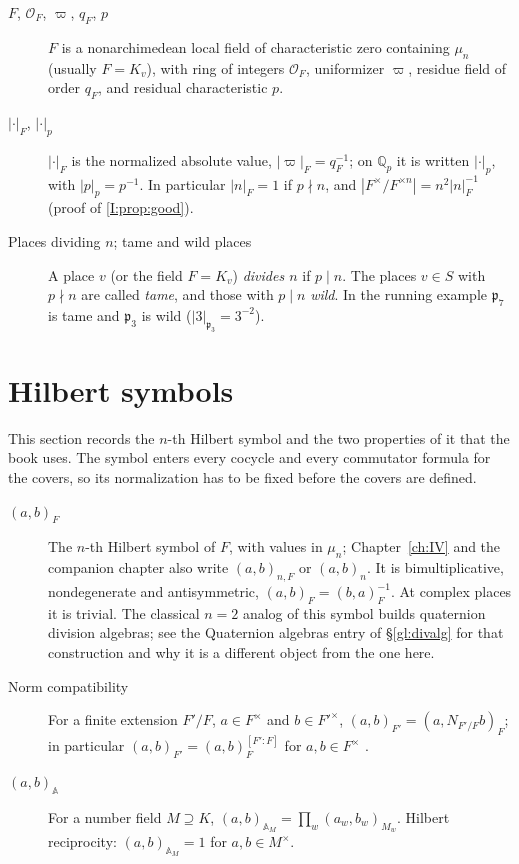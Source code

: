 \begin{description}
\item[$F$, $\mathcal O_F$, $\varpi$, $q_F$, $p$] $F$ is a
nonarchimedean local field of characteristic zero containing $\mu_n$
(usually $F=K_v$), with ring of integers $\mathcal O_F$, uniformizer
$\varpi$, residue field of order $q_F$, and residual characteristic
$p$.
\item[$|\cdot|_F$, $|\cdot|_p$] $|\cdot|_F$ is the normalized absolute
value, $|\varpi|_F=q_F^{-1}$; on $\mathbb Q_p$ it is written
$|\cdot|_p$, with $|p|_p=p^{-1}$.  In particular $|n|_F=1$ if
$p\nmid n$, and $|F^\times/F^{\times n}|=n^2|n|_F^{-1}$ (proof of \cref{I:prop:good}).
\item[Places dividing $n$; tame and wild places] A place $v$ (or the
field $F=K_v$) \emph{divides $n$} if $p\mid n$.  The places $v\in S$
with $p\nmid n$ are called \emph{tame}, and those with $p\mid n$
\emph{wild}.  In the running example $\mathfrak p_7$ is tame and
$\mathfrak p_3$ is wild ($|3|_{\mathfrak p_3}=3^{-2}$).
\end{description}

\section{Hilbert symbols}\label{gl:hilbert}
This section records the $n$-th Hilbert symbol and the two properties of it that the book uses. The symbol enters every cocycle and every commutator formula for the covers, so its normalization has to be fixed before the covers are defined.

\begin{description}
\item[$(a,b)_F$] The $n$-th Hilbert symbol of $F$, with values in
$\mu_n$; Chapter~\ref{ch:IV} and the companion chapter also write $(a,b)_{n,F}$ or
$(a,b)_n$.  It is bimultiplicative, nondegenerate and antisymmetric,
$(a,b)_F=(b,a)_F^{-1}$.  At complex places it is trivial.  The
classical $n=2$ analog of this symbol builds quaternion division
algebras; see the Quaternion algebras entry of \S\ref{gl:divalg} for
that construction and why it is a different object from the one
here.
\item[Norm compatibility] For a finite extension $F'/F$, $a\in
F^\times$ and $b\in F'^\times$, $(a,b)_{F'}=(a,N_{F'/F}b)_F$; in
particular $(a,b)_{F'}=(a,b)_F^{[F':F]}$ for $a,b\in F^\times$
\cite[Ch.~XIV]{Ser79}.
\item[$(a,b)_{\mathbb A}$] For a number field $M\supseteq K$,
$(a,b)_{\mathbb A_M}=\prod_w(a_w,b_w)_{M_w}$.  Hilbert reciprocity:
$(a,b)_{\mathbb A_M}=1$ for $a,b\in M^\times$.
\end{description}

